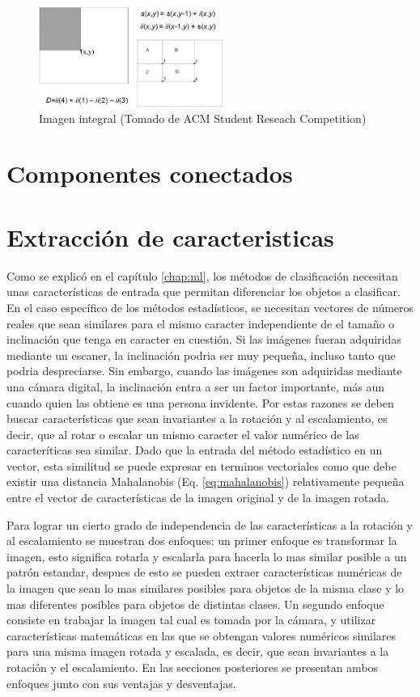 \documentclass[a4paper, 11pt, oneside]{report}
\begin{document}
\begin{figure}[htb]
\begin{center}
\leavevmode
\includegraphics[width=6cm]{img/integral.png}
\end{center}
\caption{Imagen integral (Tomado de ACM Student Reseach Competition)}
\label{fig:integral}
\end{figure}


\section{Componentes conectados}

\section{Extracción de caracteristicas}

Como se explicó en el capítulo \ref{chap:ml}, los métodos de clasificación necesitan unas características de entrada que permitan diferenciar los objetos a clasificar. En el caso específico de los métodos estadísticos, se necesitan vectores de números reales que sean similares para el mismo caracter independiente de el tamaño o inclinación que tenga en caracter en cuestión. Si las imágenes fueran adquiridas mediante un escaner, la inclinación podria ser muy pequeña, incluso tanto que podria despreciarse. Sin embargo, cuando las imágenes son adquiridas mediante una cámara digital, la inclinación entra a ser un factor importante, más aun cuando quien las obtiene es una persona invidente. Por estas razones se deben buscar características que sean invariantes a la rotación y al escalamiento, es decir, que al rotar o escalar un mismo caracter el valor numérico de las caracteríticas sea similar. Dado que la entrada del método estadístico en un vector, esta similitud se puede expresar en terminos vectoriales como que debe existir una distancia Mahalanobis (Eq. \ref{eq:mahalanobis}) relativamente pequeña entre el vector de características de la imagen original y de la imagen rotada.

Para lograr un cierto grado de independencia de las características a la rotación y al escalamiento se muestran dos enfoques: un primer enfoque es transformar la imagen, esto significa rotarla y escalarla para hacerla lo mas similar posible a un patrón estandar, despues de esto se pueden extraer características numéricas de la imagen que sean lo mas similares posibles para objetos de la misma clase y lo mas diferentes posibles para objetos de distintas clases. Un segundo enfoque consiste en trabajar la imagen tal cual es tomada por la cámara, y utilizar características matemáticas en las que se obtengan valores numéricos similares para una misma imagen rotada y escalada, es decir, que sean invariantes a la rotación y el escalamiento. En las secciones posteriores se presentan ambos enfoques junto con sus ventajas y desventajas.
\end{document}
